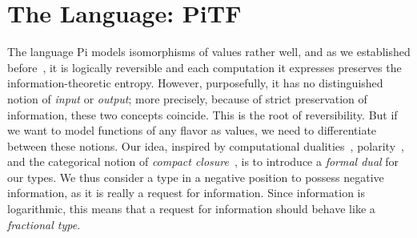 \documentclass{llncs}
\newcommand{\roshan}[1]{}
\begin{document}

\section{The Language: {{PiTF}} }

The language {{Pi}} models isomorphisms of values rather well, and as we
established before~\cite{James:2012:IE:2103656.2103667,rc2011,rc2012}, it is
logically reversible and each computation it expresses preserves the
information-theoretic entropy. However, purposefully, it has no distinguished
notion of \emph{input} or \emph{output}; more precisely, because of strict
preservation of information, these two concepts coincide.  This is the root
of reversibility. But if we want to model functions of any flavor as values,
we need to differentiate between these notions. Our idea, inspired by
computational dualities~\cite{Filinski:1989:DCI:648332.755574,Curien:2000},
polarity~\cite{Girard87tcs,10.1109/LICS.2010.23}, and the categorical notion
of \emph{compact
  closure}~\cite{Selinger:2007:DCC:1229185.1229207,Abramsky:2004:CSQ:1018438.1021878},
is to introduce a \emph{formal dual} for our types.  We thus consider a type
in a negative position to possess negative information, as it is really a
request for information.  Since information is logarithmic, this means that a
request for information should behave like a \emph{fractional type}.



%

\end{document}
